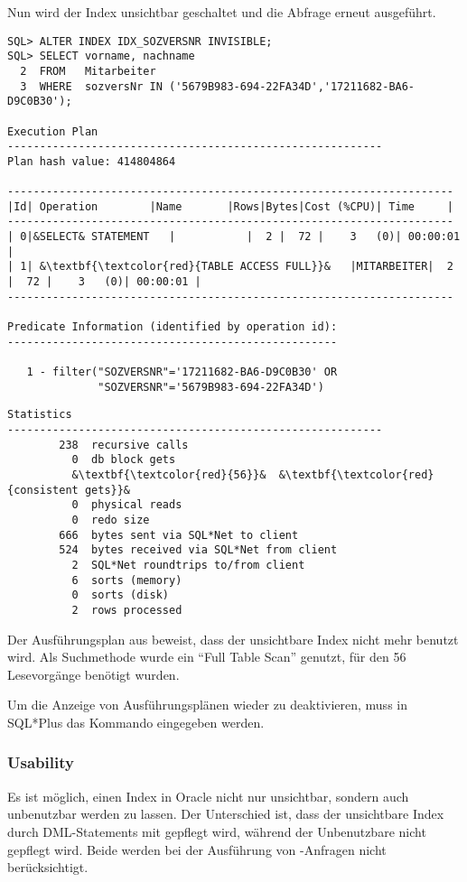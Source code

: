           Nun wird der Index unsichtbar geschaltet und die Abfrage erneut ausgeführt.
          \begin{lstlisting}[caption={Der Index wird unsichtbar und das Statement wird wiederholt},label=admin328,language=oracle_sql]
SQL> ALTER INDEX IDX_SOZVERSNR INVISIBLE;
SQL> SELECT vorname, nachname
  2  FROM   Mitarbeiter
  3  WHERE  sozversNr IN ('5679B983-694-22FA34D','17211682-BA6-D9C0B30');

Execution Plan
----------------------------------------------------------
Plan hash value: 414804864

---------------------------------------------------------------------
|Id| Operation        |Name       |Rows|Bytes|Cost (%CPU)| Time     |
---------------------------------------------------------------------
| 0|&SELECT& STATEMENT   |           |  2 |  72 |    3   (0)| 00:00:01 |
| 1| &\textbf{\textcolor{red}{TABLE ACCESS FULL}}&   |MITARBEITER|  2 |  72 |    3   (0)| 00:00:01 |
---------------------------------------------------------------------

Predicate Information (identified by operation id):
---------------------------------------------------

   1 - filter("SOZVERSNR"='17211682-BA6-D9C0B30' OR
              "SOZVERSNR"='5679B983-694-22FA34D')
          \end{lstlisting}
          \begin{lstlisting}[caption={Der Index wird unsichtbar und das
          Statement wird wiederholt - Fortsetzung},language=terminal]
Statistics
----------------------------------------------------------
        238  recursive calls
          0  db block gets
          &\textbf{\textcolor{red}{56}}&  &\textbf{\textcolor{red}{consistent gets}}&
          0  physical reads
          0  redo size
        666  bytes sent via SQL*Net to client
        524  bytes received via SQL*Net from client
          2  SQL*Net roundtrips to/from client
          6  sorts (memory)
          0  sorts (disk)
          2  rows processed
          \end{lstlisting}
          Der Ausführungsplan aus  beweist, dass der unsichtbare Index nicht mehr benutzt wird. Als Suchmethode wurde ein \enquote{Full Table Scan} genutzt, für den 56 Lesevorgänge benötigt wurden.

          Um die Anzeige von Ausführungsplänen wieder zu deaktivieren, muss in SQL*Plus das Kommando  eingegeben werden.
        \subsubsection{Usability}
          Es ist möglich, einen Index in Oracle nicht nur unsichtbar, sondern auch unbenutzbar werden zu lassen. Der Unterschied ist, dass der unsichtbare Index durch DML-Statements mit gepflegt wird, während der Unbenutzbare nicht gepflegt wird. Beide werden bei der Ausführung von -Anfragen nicht berücksichtigt.

